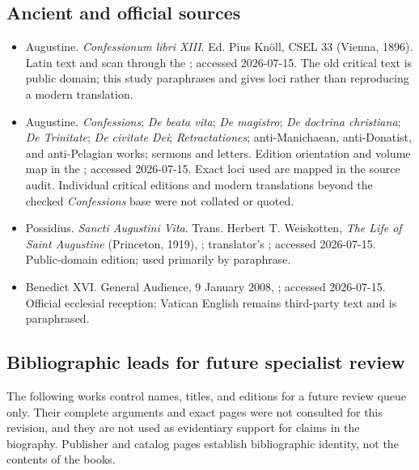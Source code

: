 \subsection{Ancient and official sources}

\begin{itemize}
\item Augustine. \emph{Confessionum libri XIII}. Ed. Pius Knöll, CSEL 33
(Vienna, 1896). Latin text and scan through the
; accessed 2026-07-15. The old critical text is public domain;
this study paraphrases and gives loci rather than reproducing a modern
translation.
\item Augustine. \emph{Confessions}; \emph{De beata vita};
\emph{De magistro}; \emph{De doctrina christiana}; \emph{De Trinitate};
\emph{De civitate Dei}; \emph{Retractationes}; anti-Manichaean,
anti-Donatist, and anti-Pelagian works; sermons and letters. Edition
  orientation and volume map in the
; accessed
  2026-07-15. Exact loci used are mapped in the source audit. Individual
  critical editions and modern translations beyond the checked
  \emph{Confessions} base were not collated or quoted.
\item Possidius. \emph{Sancti Augustini Vita}. Trans. Herbert T. Weiskotten,
\emph{The Life of Saint Augustine} (Princeton, 1919),
; translator's
;
accessed 2026-07-15. Public-domain edition; used primarily by paraphrase.
\item Benedict XVI\@. General Audience, 9 January 2008,
;
accessed 2026-07-15. Official ecclesial reception; Vatican English remains
third-party text and is paraphrased.
\end{itemize}

\subsection{Bibliographic leads for future specialist review}

The following works control names, titles, and editions for a future review
queue only. Their complete arguments and exact pages were not consulted for
this revision, and they are not used as evidentiary support for claims in the
biography. Publisher and catalog pages establish bibliographic identity, not
the contents of the books.

